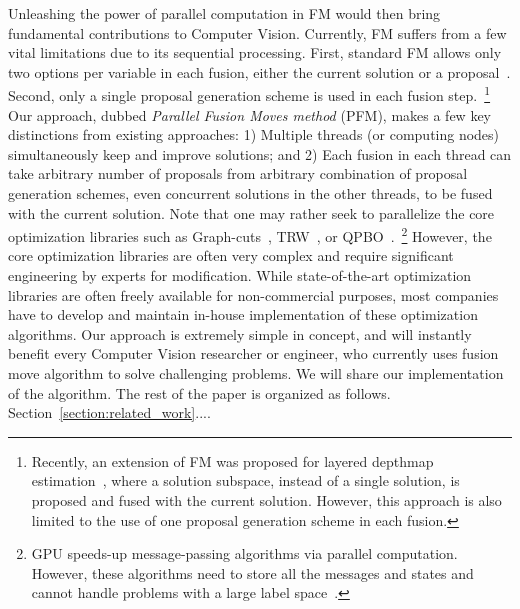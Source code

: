 Unleashing the power of parallel computation in FM
would then bring fundamental contributions to Computer
Vision. Currently, FM suffers from a few vital limitations due to its
sequential processing. First, standard FM allows only two options per
variable in each fusion, either the current solution or a
proposal~\cite{fusion_moves_for_markov_random_field_optimization}. Second,
only a single proposal generation scheme is used in each fusion
step.~\footnote{Recently, an extension of FM was proposed for layered
depthmap estimation~\cite{chen_2016}, where a solution subspace, instead
of a single solution, is proposed and fused with the current
solution. However, this approach is also limited to the use of one proposal
generation scheme in each fusion.}
%
Our approach, dubbed {\it Parallel Fusion Moves method} (PFM), makes a
few key distinctions from existing approaches: 1) Multiple threads (or
computing nodes) simultaneously keep and improve solutions; and 2) Each
fusion in each thread can take arbitrary number of proposals from
arbitrary combination of proposal generation schemes, even concurrent
solutions in the other threads, to be fused with the current solution.
%
Note that one may rather seek to parallelize the core optimization
libraries such as Graph-cuts~\cite{}, TRW~\cite{kolmogorov}, or
QPBO~\cite{}.~\footnote{GPU speeds-up message-passing algorithms via
parallel computation. However, these algorithms need to store all the
messages and states and cannot handle problems with a large label space~\cite{layered_depthmap}.} However, the core optimization libraries are often
very complex and require significant engineering by experts for
modification.
%
While state-of-the-art optimization libraries are often freely available for
non-commercial purposes, most companies have to develop and maintain
in-house implementation of these optimization algorithms.
%
%
Our approach is extremely simple in concept, and will instantly benefit
every Computer Vision researcher or engineer, who currently uses fusion
move algorithm to solve challenging problems. We will share our
implementation of the algorithm. The rest of the paper is organized as
follows. Section~\ref{section:related_work}....


